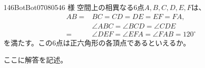 \begin{thm}{146}{}{BotBot07080546 様}
 空間上の相異なる6点$A, B, C, D, E, F$は、
 \begin{align*}
  AB=&BC=CD=DE=EF=FA, \\
  &\angle{ABC}=\angle{BCD}=\angle{CDE} \\
  =&\angle{DEF}=\angle{EFA}=\angle{FAB}=120^\circ
 \end{align*}
 を満たす。この6点は正六角形の各頂点であるといえるか。
\end{thm}

ここに解答を記述。